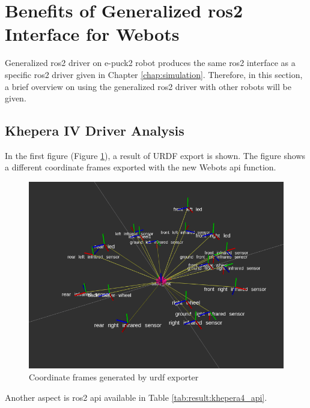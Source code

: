 \section{Benefits of Generalized \ac{ros2} Interface for Webots}

Generalized \ac{ros2} driver on e-puck2 robot produces the same \ac{ros2} interface as a specific \ac{ros2} driver given in Chapter \ref{chap:simulation}.
Therefore, in this section, a brief overview on using the generalized \ac{ros2} driver with other robots will be given.

\subsection{Khepera IV Driver Analysis}

In the first figure (Figure \ref{fig:results:khepera4_transforms}), a result of URDF export is shown.
The figure shows a different coordinate frames exported with the new Webots \ac{api} function.

\begin{figure}[H]
    \centering
    \includegraphics[width=1\textwidth]{./results/figures/khepera4_transforms}
    \caption{Coordinate frames generated by \ac{urdf} exporter}
    \label{fig:results:khepera4_transforms}
\end{figure}

Another aspect is \ac{ros2} \ac{api} available in Table \ref{tab:result:khepera4_api}.

